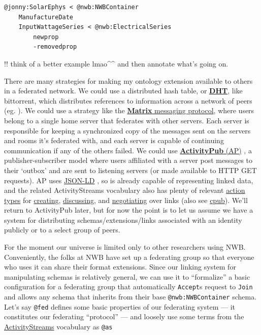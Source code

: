 \documentclass[10pt]{article}
\begin{document}
\begin{multicols}{2}
\begin{verbatim}
@jonny:SolarEphys < @nwb:NWBContainer
    ManufactureDate
    InputWattageSeries < @nwb:ElectricalSeries
        newprop
        -removedprop
\end{verbatim}

!! think of a better example lmao\^{}\^{} and then annotate what's going
on.

There are many strategies for making my ontology extension available to
others in a federated network. We could use a distributed hash table, or
\href{https://en.wikipedia.org/wiki/Distributed_hash_table}{\textbf{DHT}},
like bittorrent, which distributes references to information across a
network of peers (eg. \cite{pirroDHTbasedSemanticOverlay2012} ).
We could use a strategy like the
\href{https://matrix.org/}{\textbf{Matrix} messaging protocol}, where
users belong to a single home server that federates with other servers.
Each server is responsible for keeping a synchronized copy of the
messages sent on the servers and rooms it's federated with, and each
server is capable of continuing communication if any of the others
failed. We could use
\href{https://www.w3.org/TR/2018/REC-activitypub-20180123/}{\textbf{ActivityPub}
(AP)} \cite{Webber:18:A} , a publisher-subscriber model where
users affiliated with a server post messages to their `outbox' and are
sent to listening servers (or made available to HTTP GET requests). AP
uses \href{https://json-ld.org/}{JSON-LD} \cite{spornyJSONLDJSONbasedSerialization2020} , so is already capable of
representing linked data, and the related ActivityStreams vocabulary
\cite{snellActivityStreams2017}  also has plenty of relevant
\href{https://www.w3.org/TR/activitystreams-vocabulary/\#activity-types}{action
types} for
\href{https://www.w3.org/TR/activitystreams-vocabulary/\#dfn-create}{creating},
\href{https://www.w3.org/TR/activitystreams-vocabulary/\#dfn-question}{discussing},
and
\href{https://www.w3.org/TR/activitystreams-vocabulary/\#dfn-tentativeaccept}{negotiating}
over links (also see
\href{https://github.com/openEngiadina/cpub}{cpub}). We'll return to
ActivityPub later, but for now the point is to let us assume we have a
system for distributing schemas/extensions/links associated with an
identity publicly or to a select group of peers.

For the moment our universe is limited only to other researchers using
NWB. Conveniently, the folks at NWB have set up a federating group so
that everyone who uses it can share their format extensions. Since our
linking system for manipulating schemas is relatively general, we can
use it to ``formalize'' a basic configuration for a federating group
that automatically \texttt{Accept}s request to \texttt{Join} and allows
any schema that inherits from their base \texttt{@nwb:NWBContainer}
schema. Let's say \texttt{@fed} defines some basic properties of our
federating system --- it constitutes our federating ``protocol'' --- and
loosely use some terms from the
\href{https://www.w3.org/ns/activitystreams\#class-definitions}{ActivityStreams}
vocabulary as \texttt{@as}


\end{multicols}
\end{document}
